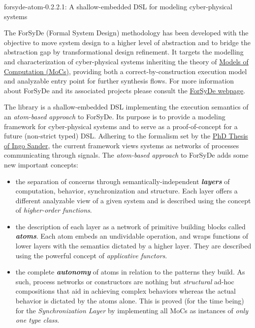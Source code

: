 \documentclass{book}
\begin{document}
\begin{titlepage}
\begin{haddocktitle}
forsyde-atom-0.2.2.1: A shallow-embedded DSL for modeling cyber-physical systems
\end{haddocktitle}
\begin{haddockprologue}
The ForSyDe (Formal System Design) methodology has been developed
with the objective to move system design to a higher level of
abstraction and to bridge the abstraction gap by transformational
design refinement. It targets the modelling and characterization of
cyber-physical systems inheriting the theory of
\href{http://ieeexplore.ieee.org/stamp/stamp.jsp?arnumber=736561}{Models of Computation (MoCs)},
providing both a correct-by-construction execution model and
analyzable entry point for further synthesis flows. For more information
about ForSyDe and its associated projects please consult the
\href{https://github.com/forsyde}{ForSyDe webpage}.\par
The  library is a shallow-embedded DSL implementing
the execution semantics of an \emph{atom-based approach} to ForSyDe. Its
purpose is to provide a modeling framework for cyber-physical
systems and to serve as a proof-of-concept for a future (non-strict
typed) DSL. Adhering to the formalism set by the
\href{http://www.diva-portal.org/smash/get/diva2:9340/FULLTEXT01.pdf}{PhD Thesis of Ingo Sander},
the current framework views systems as networks of processes
communicating through signals. The \emph{atom-based approach} to ForSyDe
adds some new important concepts:\par
\begin{itemize}
\item
the separation of concerns through semantically-independent
\textbf{\emph{layers}} of computation, behavior, synchronization and
structure. Each layer offers a different analyzable view of a
given system and is described using the concept of
\emph{higher-order functions}.\par

\item
the description of each layer as a network of primitive building
blocks called \textbf{\emph{atoms}}. Each atom embeds an undividable operation,
and wraps functions of lower layers with the semantics dictated by
a higher layer. They are described using the powerful concept of
\emph{applicative functors}.\par

\item
the complete \textbf{\emph{autonomy}} of atoms in relation to the patterns
they build. As such, process networks or constructors are nothing
but \emph{structural} ad-hoc compositions that aid in achieving complex
behaviors whereas the actual behavior is dictated by the atoms
alone. This is proved (for the time being) for the
\emph{Synchronization Layer} by implementing all MoCs as instances of
\emph{only one type class}.\par


\end{itemize}
\end{haddockprologue}
\end{titlepage}
\end{document}
